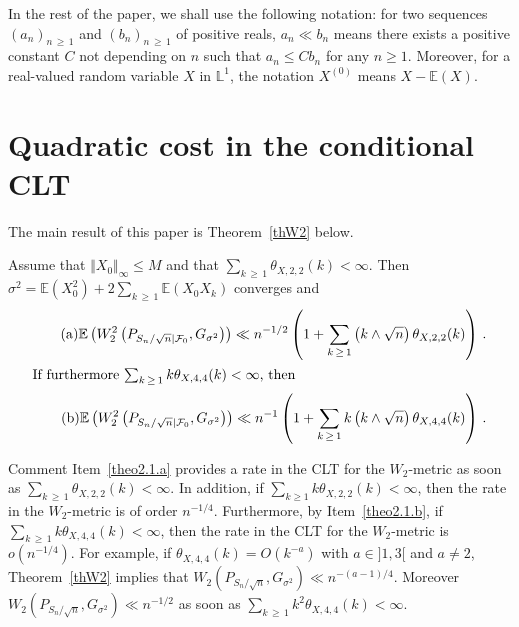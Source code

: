 \documentclass[AHL,Unicode,longabstracts,published]{cedram}
\newcommand{\bbE}{\mathbb{E}}
\newcommand{\clF}{\mathcal{F}}
\newcommand{\bbL}{\mathbb{L}}
\begin{document}

In the rest of the paper, we shall use the following notation: for two sequences $(a_n)_{n\,\geq\,1}$ and $(b_n)_{n\,\geq\,1}$ of positive reals, $a_n \ll b_n$ means there exists a positive constant $C$ not depending on $n$ such that $a_n \leq C b_n$ for any $n\geq 1$. Moreover, for a real-valued random variable $X$ in $\bbL^1$, the notation $X^{(0)}$ means $X - \bbE (X)$.



\section{Quadratic cost in the conditional CLT} \label{section2}

The main result of this paper is Theorem~\ref{thW2} below.

\begin{theo} \label{thW2}
Assume that $\Vert X_0 \Vert_{\infty} \leq M$ and that $\sum_{k\,\geq\,1} \theta_{X,2,2} (k) < \infty$. Then $\sigma^2 = \bbE (X_0^2) + 2 \sum_{k\,\geq\,1}\bbE (X_0X_k)$ converges and
\begin{align}
\tag{$\rm a$}\bbE \left(W_2^2 \left(P_{S_n / {\sqrt n} |\clF_0 }, G_{\sigma^2}\right) \right) \ll n^{-1/2} \left(1 + \sum_{k\,\geq\,1} \left(k \wedge \sqrt{n}\right) \theta_{X,2,2} (k) \right) \,.\label{theo2.1.a}
\\
\intertext{If furthermore $ \sum_{k\,\geq\,1} k \theta_{X,4,4} (k) < \infty$, then}
\tag{$\rm b$}\bbE \left(W_2^2 \left(P_{S_n / {\sqrt n} |\clF_0 }, G_{\sigma^2}\right) \right) \ll n^{-1} \left(1 + \sum_{k\,\geq\,1} k \left(k \wedge \sqrt{n}\right) \theta_{X,4,4} (k) \right)\,.\label{theo2.1.b}
\end{align}
\end{theo}

\begin{enonce}{Comment}\label{comm2.2}
Item~\eqref{theo2.1.a} provides a rate in the CLT for the $W_2$-metric as soon as $\sum_{k\,\geq\,1} \theta_{X,2,2} (k) < \infty$. In addition, if $ \sum_{k\geq 1} k \theta_{X,2,2} (k) < \infty$, then the rate in the $W_2$-metric is of order $n^{-1/4}$. Furthermore, by Item~\eqref{theo2.1.b}, if $ \sum_{k\,\geq\,1} k \theta_{X,4,4} (k) < \infty$, then the rate in the CLT for the $W_2$-metric is $o (n^{-1/4})$. For example, if $\theta_{X,4,4} (k) = O (k^{-a}) $ with $ a \in]1,3[$ and $a \neq 2$, Theorem~\ref{thW2} implies that $W_2 (P_{S_n / {\sqrt n} }, G_{\sigma^2}) \ll n^{-(a-1)/4} $. Moreover $ W_2 (P_{S_n / {\sqrt n} }, G_{\sigma^2}) \ll n^{-1/2}$ as soon as $ \sum_{k\,\geq\,1} k^2 \theta_{X,4,4} (k) < \infty$.
\end{enonce}
\end{document}

